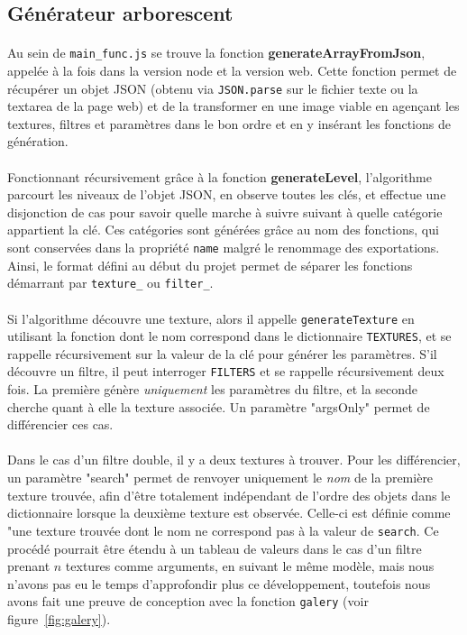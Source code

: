 \documentclass[a4paper]{article}
\begin{document}
\subsection{Générateur arborescent}
\label{sec:arborescent}

\paragraph{}
Au sein de \texttt{main\_func.js} se trouve la fonction \textbf{generateArrayFromJson}, appelée à la fois dans la version node et la version web. Cette fonction permet de récupérer un objet JSON (obtenu via \texttt{JSON.parse} sur le fichier texte ou la textarea de la page web) et de la transformer en une image viable en agençant les textures, filtres et paramètres dans le bon ordre et en y insérant les fonctions de génération.

\paragraph{}
Fonctionnant récursivement grâce à la fonction \textbf{generateLevel}, l'algorithme parcourt les niveaux de l'objet JSON, en observe toutes les clés, et effectue une disjonction de cas pour savoir quelle marche à suivre suivant à quelle catégorie appartient la clé. Ces catégories sont générées grâce au nom des fonctions, qui sont conservées dans la propriété \texttt{name} malgré le renommage des exportations. Ainsi, le format défini au début du projet permet de séparer les fonctions démarrant par \texttt{texture\_} ou \texttt{filter\_}.

\paragraph{}
Si l'algorithme découvre une texture, alors il appelle \texttt{generateTexture} en utilisant la fonction dont le nom correspond dans le dictionnaire \texttt{TEXTURES}, et se rappelle récursivement sur la valeur de la clé pour générer les paramètres. S'il découvre un filtre, il peut interroger \texttt{FILTERS} et se rappelle récursivement deux fois. La première génère \textit{uniquement} les paramètres du filtre, et la seconde cherche quant à elle la texture associée. Un paramètre "argsOnly" permet de différencier ces cas.

\paragraph{}
Dans le cas d'un filtre double, il y a deux textures à trouver. Pour les différencier, un paramètre "search" permet de renvoyer uniquement le \textit{nom} de la première texture trouvée, afin d'être totalement indépendant de l'ordre des objets dans le dictionnaire lorsque la deuxième texture est observée. Celle-ci est définie comme "une texture trouvée dont le nom ne correspond pas à la valeur de \texttt{search}. Ce procédé pourrait être étendu à un tableau de valeurs dans le cas d'un filtre prenant $n$ textures comme arguments, en suivant le même modèle, mais nous n'avons pas eu le temps d'approfondir plus ce développement, toutefois nous avons fait une preuve de conception avec la fonction \texttt{galery} (voir figure~\ref{fig:galery}).
\end{document}
